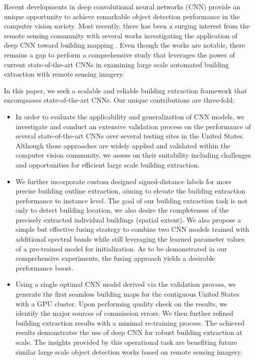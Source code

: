 \documentclass[journal]{IEEEtran}
\begin{document}
Recent developments in deep convolutional neural networks (CNN) provide an unique opportunity to achieve remarkable object detection performance in the computer vision society. Most recently, there has been a surging interest from the remote sensing community with several works investigating the application of deep CNN toward building mapping \cite{PaisitkriangkraiSherrahJanneyEtAl2016, Yuan2018, Bittner2017481, 7729471,Lunga2018}. Even though the works are notable, there remains a gap to perform a comprehensive study that leverages the power of current state-of-the-art CNNs in examining large scale automated building extraction with remote sensing imagery. 

In this paper, we seek a scalable and reliable building extraction framework that encompasses state-of-the-art CNNs. Our unique contributions are three-fold: 
\begin{itemize}

	\item In order to evaluate the applicability and generalization of CNN models, we investigate and conduct an extensive validation process on the performance of several state-of-the-art CNNs over several testing sites in the United States. Although these approaches are widely applied and validated within the computer vision community, we assess on their suitability including challenges and opportunities for efficient large scale building extraction.
	\item We further incorporate custom designed signed-distance labels for more precise building outline extraction, aiming to elevate the building extraction performance to instance level. The goal of our building extraction task is not only to detect building location, we also desire the completeness of the  precisely extracted individual buildings (spatial extent). We also propose a simple but effective fusing strategy to combine two CNN models trained with additional spectral bands while still leveraging the learned parameter values of a pre-trained model for initialization. As to be demonstrated in our comprehensive experiments, the fusing approach yields a desirable performance boost.
	
	\item Using a single optimal CNN model derived via the validation process, we generate the first seamless building maps for the contiguous United States with a GPU cluster. Upon performing quality check on the results, we identify the major sources of commission errors. We then further refined building extraction results with a minimal re-training process. The achieved results demonstrates the use of deep CNN for robust building extraction at scale.  The insights provided by this operational task are benefiting future similar large scale object detection works based on remote sensing imagery.
\end{itemize}
\end{document}
